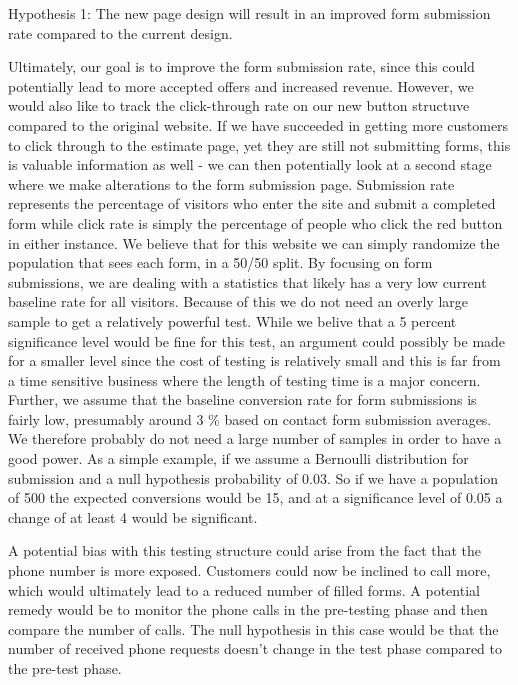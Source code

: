 \documentclass[12pt, authoryear]{elsarticle}
\begin{document}
Hypothesis 1: The new page design will result in an improved form submission rate compared to the current design.

Ultimately, our goal is to improve the form submission rate, since this could potentially lead to more accepted offers and increased revenue. However, we would also like to track the click-through rate on our new button structuve compared to the original website.
If we have succeeded in getting more customers to click through to the estimate page, yet they are still not submitting forms, this is valuable information as well - we can then potentially look at a second stage where we make alterations to the form submission page.
Submission rate represents the percentage of visitors who enter the site and submit a completed form while click rate is simply the percentage of people who click the red button in either instance. We believe that for this website we can simply randomize the population that sees each form, in a 50/50 split. By focusing on form submissions, we are dealing with a statistics that likely has a very low current baseline rate for all visitors.  Because of this we do not need an overly large sample to get a relatively powerful test. While we belive that a 5 percent significance level would be fine for this test, an argument could possibly be made for a smaller level since the cost of testing is relatively small and this is far from a time sensitive business where the length of testing time is a major concern. Further, we assume that the baseline conversion rate for form submissions is fairly low, presumably around 3 \% based on contact form submission averages.  %
We therefore probably do not need a large number of samples in order to have a good power.
As a simple example, if we assume a Bernoulli distribution for submission and a null hypothesis probability of 0.03.  So if we have a population of 500 the expected conversions would be 15, and at a significance level of 0.05 a change of at least 4 would be significant.

A potential bias with this testing structure could arise from the fact that the phone number is more exposed. Customers could now be inclined to call more, which would ultimately lead to a reduced number of filled forms. A potential remedy would be to monitor the phone calls in the pre-testing phase and then compare the number of calls. The null hypothesis in this case would be that the number of received phone requests doesn’t change in the test phase compared to the pre-test phase.
\end{document}
